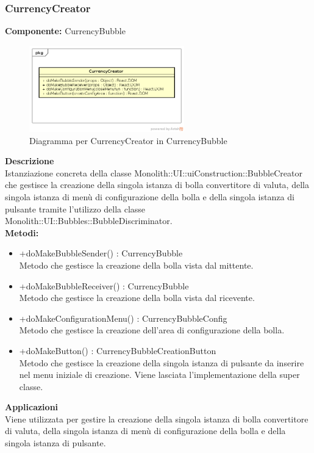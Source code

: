 \subsubsection{CurrencyCreator}
\textbf{Componente:}  CurrencyBubble\\
   \FloatBarrier
   \begin{figure}[ht]
   \centering
   \includegraphics[width=0.6\textwidth]{img/single-CurrencyCreator.png}
   \caption{{Diagramma per CurrencyCreator in CurrencyBubble}}
\end{figure}
\FloatBarrier
\textbf{Descrizione}\\
Istanziazione concreta della classe Monolith::UI::uiConstruction::BubbleCreator che gestisce la creazione della singola istanza di bolla convertitore di valuta, della singola istanza di menù di configurazione della bolla e della singola istanza di pulsante tramite l'utilizzo della classe Monolith::UI::Bubbles::BubbleDiscriminator.
\\
\textbf{Metodi:} 
\begin{itemize}
\item +doMakeBubbleSender() : CurrencyBubble 
\\
Metodo che gestisce la creazione della bolla vista dal mittente.
\item +doMakeBubbleReceiver() : CurrencyBubble 
\\
Metodo che gestisce la creazione della bolla vista dal ricevente.
\item +doMakeConfigurationMenu() : CurrencyBubbleConfig 
\\
Metodo che gestisce la creazione dell'area di configurazione della bolla.
\item +doMakeButton() : CurrencyBubbleCreationButton 
\\
Metodo che gestisce la creazione della singola istanza di pulsante da inserire nel menu iniziale di creazione. Viene lasciata l'implementazione della super classe.
\end{itemize} 


\textbf{Applicazioni}\\
Viene utilizzata per gestire la creazione della singola istanza di bolla convertitore di valuta, della singola istanza di menù di configurazione della bolla e della singola istanza di pulsante. 



